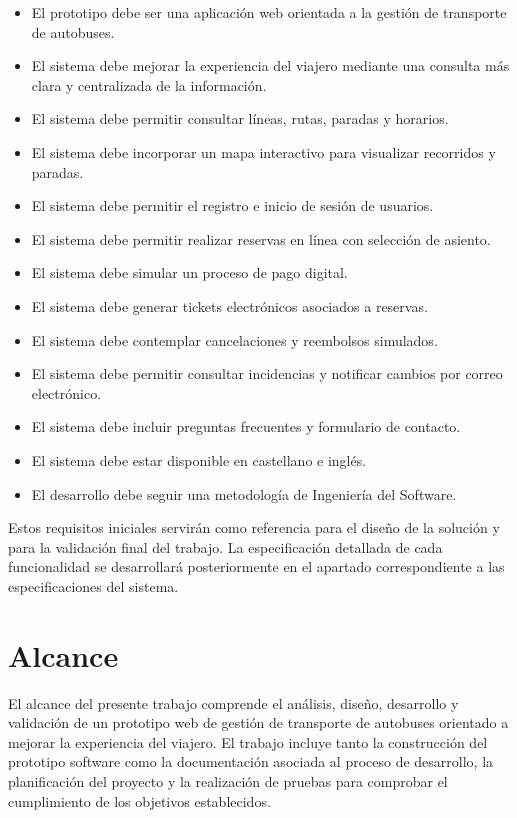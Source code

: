 \begin{itemize}
    \item El prototipo debe ser una aplicación web orientada a la gestión de transporte de autobuses.
    \item El sistema debe mejorar la experiencia del viajero mediante una consulta más clara y centralizada de la información.
    \item El sistema debe permitir consultar líneas, rutas, paradas y horarios.
    \item El sistema debe incorporar un mapa interactivo para visualizar recorridos y paradas.
    \item El sistema debe permitir el registro e inicio de sesión de usuarios.
    \item El sistema debe permitir realizar reservas en línea con selección de asiento.
    \item El sistema debe simular un proceso de pago digital.
    \item El sistema debe generar tickets electrónicos asociados a reservas.
    \item El sistema debe contemplar cancelaciones y reembolsos simulados.
    \item El sistema debe permitir consultar incidencias y notificar cambios por correo electrónico.
    \item El sistema debe incluir preguntas frecuentes y formulario de contacto.
    \item El sistema debe estar disponible en castellano e inglés.
    \item El desarrollo debe seguir una metodología de Ingeniería del Software.
\end{itemize}

Estos requisitos iniciales servirán como referencia para el diseño de la solución y para la validación final del trabajo. La especificación detallada de cada funcionalidad se desarrollará posteriormente en el apartado correspondiente a las especificaciones del sistema.


\section{Alcance}
\label{sec:alcance}

El alcance del presente trabajo comprende el análisis, diseño, desarrollo y validación de un prototipo web de gestión de transporte de autobuses orientado a mejorar la experiencia del viajero. El trabajo incluye tanto la construcción del prototipo software como la documentación asociada al proceso de desarrollo, la planificación del proyecto y la realización de pruebas para comprobar el cumplimiento de los objetivos establecidos.

